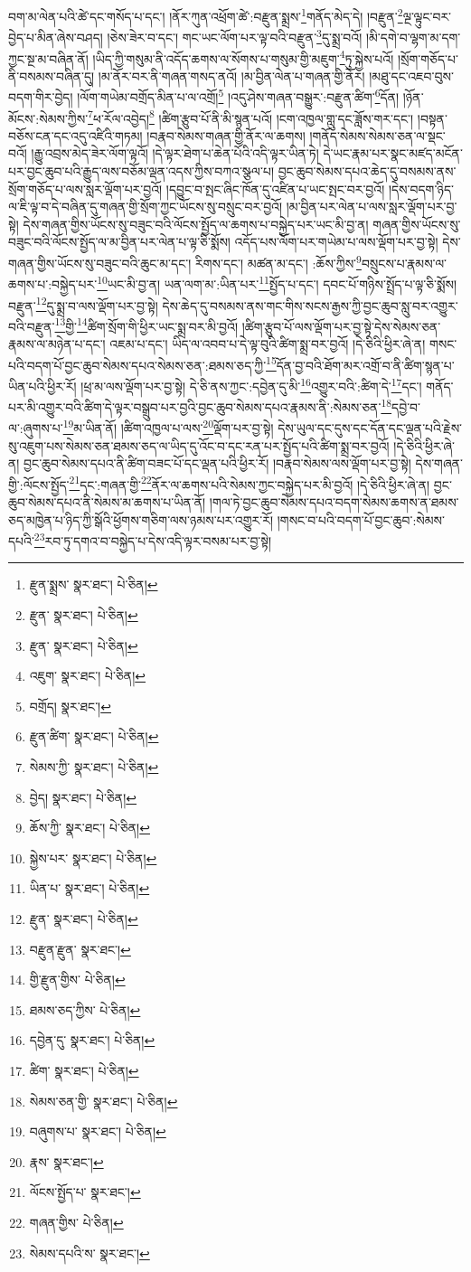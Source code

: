 བག་མ་ལེན་པའི་ཚེ་དང་གསོད་པ་དང་། །ནོར་ཀུན་འཕྲོག་ཚེ་:བརྫུན་སྨྲས་\footnote{རྫུན་སྨྲས་  སྣར་ཐང་།  པེ་ཅིན། }གནོད་མེད་དེ། །བརྫུན་\footnote{རྫུན་  སྣར་ཐང་།  པེ་ཅིན། }ལྔ་ལྟུང་བར་བྱེད་པ་མིན་ཞེས་བཤད། །ཅེས་ཟེར་བ་དང་། གང་ཡང་ལོག་པར་ལྟ་བའི་བརྫུན་\footnote{རྫུན་  སྣར་ཐང་།  པེ་ཅིན། }དུ་སྨྲ་བའོ། །མི་དགེ་བ་ལྷག་མ་དག་ཀྱང་སྔ་མ་བཞིན་ནོ། །ཡིད་ཀྱི་གསུམ་ནི་འདོད་ཆགས་ལ་སོགས་པ་གསུམ་གྱི་མཇུག་\footnote{འཇུག་  སྣར་ཐང་།  པེ་ཅིན། }ཏུ་སྐྱེས་པའོ། །སྲོག་གཅོད་པ་ནི་བསམས་བཞིན་དུ། །མ་ནོར་བར་ནི་གཞན་གསད་ནའོ། །མ་བྱིན་ལེན་པ་གཞན་གྱི་ནོར། །མཐུ་དང་འཇབ་བུས་བདག་གིར་བྱེད། །ལོག་གཡེམ་བགྲོད་མིན་པ་ལ་འགྲོ།\footnote{བགྲོད།  སྣར་ཐང་། } །འདུ་ཤེས་གཞན་བསྒྱུར་:བརྫུན་ཚིག་\footnote{རྫུན་ཚིག་  སྣར་ཐང་།  པེ་ཅིན། }དོན། །ཉོན་མོངས་:སེམས་ཀྱིས་\footnote{སེམས་ཀྱི་  སྣར་ཐང་།  པེ་ཅིན། }ཕ་རོལ་འབྱེད།\footnote{བྱེད།  སྣར་ཐང་།  པེ་ཅིན། } །ཚིག་རྩུབ་པོ་ནི་མི་སྙན་པའོ། །ངག་འཁྱལ་གླུ་དང་ཟློས་གར་དང་། །བསྟན་བཅོས་ངན་དང་འདུ་འཛིའི་གཏམ། །བརྣབ་སེམས་གཞན་གྱི་ནོར་ལ་ཆགས། །གནོད་སེམས་སེམས་ཅན་ལ་སྡང་བའོ། །རྒྱུ་འབྲས་མེད་ཟེར་ལོག་ལྟའོ། །དེ་ལྟར་ཐེག་པ་ཆེན་པོའི་འདི་ལྟར་ཡིན་ཏེ། དེ་ཡང་རྣམ་པར་སྣང་མཛད་མངོན་པར་བྱང་ཆུབ་པའི་རྒྱུད་ལས་བཅོམ་ལྡན་འདས་ཀྱིས་བཀའ་སྩལ་པ། བྱང་ཆུབ་སེམས་དཔའ་ཆེད་དུ་བསམས་ནས་སྲོག་གཅོད་པ་ལས་སླར་ལྡོག་པར་བྱའོ། །དབྱུང་བ་སྤང་ཞིང་ཁོན་དུ་འཛིན་པ་ཡང་སྤང་བར་བྱའོ། །དེས་བདག་ཉིད་ལ་ཇི་ལྟ་བ་དེ་བཞིན་དུ་གཞན་གྱི་སྲོག་ཀྱང་ཡོངས་སུ་བསྲུང་བར་བྱའོ། །མ་བྱིན་པར་ལེན་པ་ལས་སླར་ལྡོག་པར་བྱ་སྟེ། དེས་གཞན་གྱིས་ཡོངས་སུ་བཟུང་བའི་ལོངས་སྤྱོད་ལ་ཆགས་པ་བསྐྱེད་པར་ཡང་མི་བྱ་ན། གཞན་གྱིས་ཡོངས་སུ་བཟུང་བའི་ལོངས་སྤྱོད་ལ་མ་བྱིན་པར་ལེན་པ་ལྟ་ཅི་སྨོས། འདོད་པས་ལོག་པར་གཡེམ་པ་ལས་ལྡོག་པར་བྱ་སྟེ། དེས་གཞན་གྱིས་ཡོངས་སུ་བཟུང་བའི་ཆུང་མ་དང་། རིགས་དང་། མཚན་མ་དང་། :ཆོས་ཀྱིས་\footnote{ཆོས་ཀྱི་  སྣར་ཐང་།  པེ་ཅིན། }བསྲུངས་པ་རྣམས་ལ་ཆགས་པ་:བསྐྱེད་པར་\footnote{སྐྱེས་པར་  སྣར་ཐང་།  པེ་ཅིན། }ཡང་མི་བྱ་ན། ཡན་ལག་མ་:ཡིན་པར་\footnote{ཡིན་པ་  སྣར་ཐང་།  པེ་ཅིན། }སྤྱོད་པ་དང་། དབང་པོ་གཉིས་སྤྲོད་པ་ལྟ་ཅི་སྨོས། བརྫུན་\footnote{རྫུན་  སྣར་ཐང་།  པེ་ཅིན། }དུ་སྨྲ་བ་ལས་ལྡོག་པར་བྱ་སྟེ། དེས་ཆེད་དུ་བསམས་ནས་གང་གིས་སངས་རྒྱས་ཀྱི་བྱང་ཆུབ་སླུ་བར་འགྱུར་བའི་བརྫུན་\footnote{བརྫུན་རྫུན་  སྣར་ཐང་། }གྱི་\footnote{གྱི་རྫུན་གྱིས་  པེ་ཅིན། }ཚིག་སྲོག་གི་ཕྱིར་ཡང་སྨྲ་བར་མི་བྱའོ། །ཚིག་རྩུབ་པོ་ལས་ལྡོག་པར་བྱ་སྟེ་དེས་སེམས་ཅན་རྣམས་ལ་མཉེན་པ་དང་། འཇམ་པ་དང་། ཡིད་ལ་འབབ་པ་དེ་ལྟ་བུའི་ཚིག་སྨྲ་བར་བྱའོ། །དེ་ཅིའི་ཕྱིར་ཞེ་ན། གསང་པའི་བདག་པོ་བྱང་ཆུབ་སེམས་དཔའ་སེམས་ཅན་:ཐམས་ཅད་ཀྱི་\footnote{ཐམས་ཅད་ཀྱིས་  པེ་ཅིན། }དོན་བྱ་བའི་ཐོག་མར་འགྲོ་བ་ནི་ཚིག་སྙན་པ་ཡིན་པའི་ཕྱིར་རོ། །ཕྲ་མ་ལས་ལྡོག་པར་བྱ་སྟེ། དེ་ཅི་ནས་ཀྱང་:དབྱེན་དུ་མི་\footnote{དབྱེན་དུ་  སྣར་ཐང་།  པེ་ཅིན། }འགྱུར་བའི་:ཚིག་དེ་\footnote{ཚིག་  སྣར་ཐང་།  པེ་ཅིན། }དང་། གནོད་པར་མི་འགྱུར་བའི་ཚིག་དེ་ལྟར་བསྒྲུབ་པར་བྱའི་བྱང་ཆུབ་སེམས་དཔའ་རྣམས་ནི་:སེམས་ཅན་\footnote{སེམས་ཅན་གྱི་  སྣར་ཐང་།  པེ་ཅིན། }དབྱེ་བ་ལ་:ཞུགས་པ་\footnote{བཞུགས་པ་  སྣར་ཐང་།  པེ་ཅིན། }མ་ཡིན་ནོ། །ཚིག་འཁྱལ་པ་ལས་\footnote{རྣས་  སྣར་ཐང་། }ལྡོག་པར་བྱ་སྟེ། དེས་ཡུལ་དང་དུས་དང་དོན་དང་ལྡན་པའི་རྗེས་སུ་འཇུག་པས་སེམས་ཅན་ཐམས་ཅད་ལ་ཡིད་དུ་འོང་བ་དང་རན་པར་སྤྱོད་པའི་ཚིག་སྨྲ་བར་བྱའོ། །དེ་ཅིའི་ཕྱིར་ཞེ་ན། བྱང་ཆུབ་སེམས་དཔའ་ནི་ཚིག་བཟང་པོ་དང་ལྡན་པའི་ཕྱིར་རོ། །བརྣབ་སེམས་ལས་ལྡོག་པར་བྱ་སྟེ། དེས་གཞན་གྱི་:ལོངས་སྤྱོད་\footnote{ལོངས་སྤྱོད་པ་  སྣར་ཐང་། }དང་:གཞན་གྱི་\footnote{གཞན་གྱིས་  པེ་ཅིན། }ནོར་ལ་ཆགས་པའི་སེམས་ཀྱང་བསྐྱེད་པར་མི་བྱའོ། །དེ་ཅིའི་ཕྱིར་ཞེ་ན། བྱང་ཆུབ་སེམས་དཔའ་ནི་སེམས་མ་ཆགས་པ་ཡིན་ནོ། །གལ་ཏེ་བྱང་ཆུབ་སེམས་དཔའ་བདག་སེམས་ཆགས་ན་ཐམས་ཅད་མཁྱེན་པ་ཉིད་ཀྱི་སྒོའི་ཕྱོགས་གཅིག་ལས་ཉམས་པར་འགྱུར་རོ། །གསང་བ་པའི་བདག་པོ་བྱང་ཆུབ་:སེམས་དཔའི་\footnote{སེམས་དཔའི་ས་  སྣར་ཐང་། }རབ་ཏུ་དགའ་བ་བསྐྱེད་པ་དེས་འདི་ལྟར་བསམ་པར་བྱ་སྟེ། 